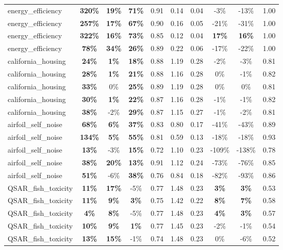 \begin{table}[!htbp]
\begin{small}
\begin{sc}
{\begin{tabular}{lccccccccc}
energy\_efficiency & \textbf{320\%} & \textbf{19\%} & \textbf{71\%} & 0.91 & 0.14 & 0.04 & -3\% & -13\% & 1.00 \\
energy\_efficiency & \textbf{257\%} & \textbf{17\%} & \textbf{67\%} & 0.90 & 0.16 & 0.05 & -21\% & -31\% & 1.00 \\
energy\_efficiency & \textbf{322\%} & \textbf{16\%} & \textbf{73\%} & 0.85 & 0.12 & 0.04 & \textbf{17\%} & \textbf{16\%} & 1.00 \\
energy\_efficiency & \textbf{78\%} & \textbf{34\%} & \textbf{26\%} & 0.89 & 0.22 & 0.06 & -17\% & -22\% & 1.00 \\
california\_housing & \textbf{24\%} & \textbf{1\%} & \textbf{18\%} & 0.88 & 1.19 & 0.28 & -2\% & -3\% & 0.81 \\
california\_housing & \textbf{28\%} & \textbf{1\%} & \textbf{21\%} & 0.88 & 1.16 & 0.28 & 0\% & -1\% & 0.82 \\
california\_housing & \textbf{33\%} & 0\% & \textbf{25\%} & 0.89 & 1.19 & 0.28 & 0\% & 0\% & 0.81 \\
california\_housing & \textbf{30\%} & \textbf{1\%} & \textbf{22\%} & 0.87 & 1.16 & 0.28 & -1\% & -1\% & 0.82 \\
california\_housing & \textbf{38\%} & -2\% & \textbf{29\%} & 0.87 & 1.15 & 0.27 & -1\% & -2\% & 0.81 \\
airfoil\_self\_noise & \textbf{68\%} & \textbf{6\%} & \textbf{37\%} & 0.83 & 0.80 & 0.17 & -41\% & -43\% & 0.89 \\
airfoil\_self\_noise & \textbf{134\%} & \textbf{5\%} & \textbf{55\%} & 0.81 & 0.59 & 0.13 & -18\% & -18\% & 0.93 \\
airfoil\_self\_noise & \textbf{13\%} & -3\% & \textbf{15\%} & 0.72 & 1.10 & 0.23 & -109\% & -138\% & 0.78 \\
airfoil\_self\_noise & \textbf{38\%} & \textbf{20\%} & \textbf{13\%} & 0.91 & 1.12 & 0.24 & -73\% & -76\% & 0.85 \\
airfoil\_self\_noise & \textbf{51\%} & -6\% & \textbf{38\%} & 0.76 & 0.84 & 0.18 & -82\% & -93\% & 0.86 \\
QSAR\_fish\_toxicity & \textbf{11\%} & \textbf{17\%} & -5\% & 0.77 & 1.48 & 0.23 & \textbf{3\%} & \textbf{3\%} & 0.53 \\
QSAR\_fish\_toxicity & \textbf{11\%} & \textbf{9\%} & \textbf{3\%} & 0.75 & 1.42 & 0.22 & \textbf{8\%} & \textbf{7\%} & 0.58 \\
QSAR\_fish\_toxicity & \textbf{4\%} & \textbf{8\%} & -5\% & 0.77 & 1.48 & 0.23 & \textbf{4\%} & \textbf{3\%} & 0.57 \\
QSAR\_fish\_toxicity & \textbf{10\%} & \textbf{9\%} & \textbf{1\%} & 0.77 & 1.45 & 0.23 & -2\% & -1\% & 0.54 \\
QSAR\_fish\_toxicity & \textbf{13\%} & \textbf{15\%} & -1\% & 0.74 & 1.48 & 0.23 & 0\% & -6\% & 0.52 \\
\bottomrule
\end{tabular}
}
\end{sc}
\end{small}
\end{table}

